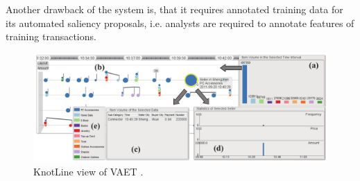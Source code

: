 \documentclass[electronic]{vgtc}             %
\begin{document}
Another drawback of the system is, that it requires annotated training data for its automated saliency proposals, i.e. analysts are required to annotate features of training transactions. 

\begin{figure}[htb]
	\centering
	\includegraphics[width=\columnwidth]{KnotLines}
	\caption{KnotLine view of VAET \cite{Xie:2014}. 
	}
	\label{fig:knotlines}
\end{figure}
\end{document}
